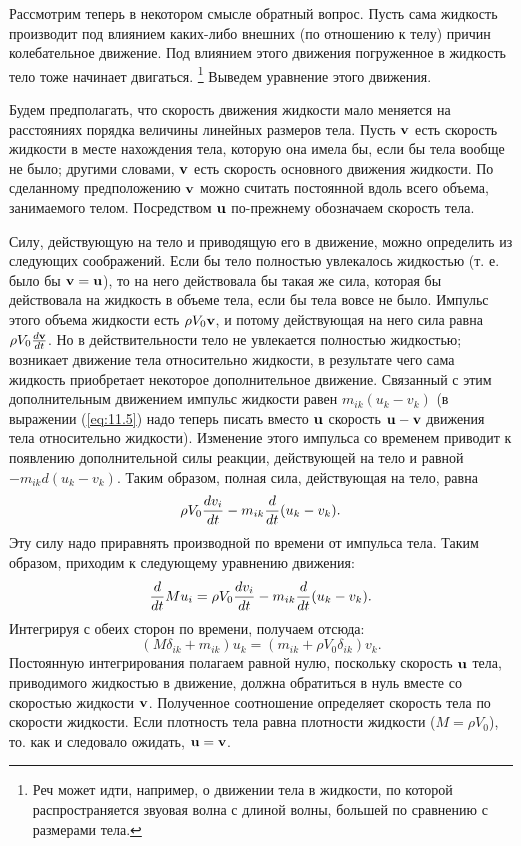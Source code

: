Рассмотрим теперь в некотором смысле обратный вопрос. Пусть сама жидкость
производит под влиянием каких-либо внешних (по отношению к телу) причин
колебательное движение. Под влиянием этого движения погруженное в жидкость тело
тоже начинает двигаться.
\footnote{Реч может идти, например, о движении тела в жидкости, по которой распространяется звуовая волна с длиной волны, большей по сравнению с размерами тела.}
Выведем уравнение этого движения.

Будем предполагать, что скорость движения жидкости мало меняется на расстояниях
порядка величины линейных размеров тела. Пусть ${\mathbf{v}}$ есть скорость жидкости в
месте нахождения тела, которую она имела бы, если бы тела вообще не было;
другими словами, ${\mathbf{v}}$ есть скорость основного движения жидкости. По сделанному
предположению ${\mathbf{v}}$ можно считать постоянной вдоль всего объема, занимаемого
телом. Посредством $\mathbf{u}$ по-прежнему обозначаем скорость тела.

Силу, действующую на тело и приводящую его в движение, можно определить из
следующих соображений. Если бы тело полностью увлекалось жидкостью (т. е. было
бы $\mathbf{v} = \mathbf{u}$), то на него действовала бы такая же сила, которая бы
действовала на жидкость в объеме тела, если бы тела вовсе не было. Импульс этого
объема жидкости есть $\rho V_0 {\mathbf{v}}$, и потому действующая на него сила равна
$\rho V_0 \frac{d{{\mathbf{v}}}}{d{t}}$. Но в действительности тело не увлекается полностью
жидкостью; возникает движение тела относительно жидкости, в результате чего сама
жидкость приобретает некоторое дополнительное движение. Связанный с этим
дополнительным движением импульс жидкости равен $m_{ik}(u_k-v_k)$ (в выражении
(\ref{eq:11.5}) надо теперь писать вместо $\mathbf{u}$ скорость $\mathbf{u-v}$ движения тела
относительно жидкости). Изменение этого импульса со временем приводит к
появлению дополнительной силы реакции, действующей на тело и равной
$-m_{ik}d(u_k-v_k)$. Таким образом, полная сила, действующая на тело, равна
\[
   \rho V_0 \frac{d{v_i}}{d{t}} - m_{ik} \frac{d}{dt}(u_k-v_k).
\]
Эту силу надо приравнять производной по времени от импульса тела. Таким образом,
приходим к следующему уравнению движения:
\[
   \frac{d}{dt}Mu_i = \rho V_0 \frac{d{v_i}}{d{t}} - m_{ik} \frac{d}{dt}(u_k-v_k).
\]
Интегрируя с обеих сторон по времени, получаем отсюда:
\begin{equation}
    \label{eq:11.9}
   (M\delta_{ik}+m_{ik})u_k = (m_{ik}+\rho V_0 \delta_{ik})v_k.
\end{equation}
Постоянную интегрирования полагаем равной нулю, поскольку скорость $\mathbf{u}$
тела, приводимого жидкостью в движение, должна обратиться в нуль вместе со
скоростью жидкости ${\mathbf{v}}$. Полученное соотношение определяет скорость тела по
скорости жидкости. Если плотность тела равна плотности жидкости ($M=\rho V_0$),
то. как и следовало ожидать, $\mathbf{u=v}$.

